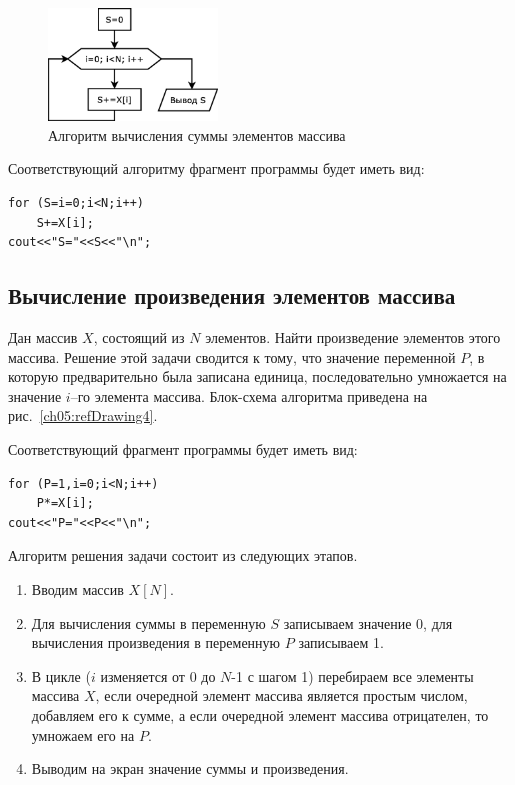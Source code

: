 \begin{figure}[htb]
\begin{center}
\includegraphics[width=0.4\textwidth]{img/ris_5_4}
\caption{Алгоритм вычисления суммы элементов массива}
\label{ch05:refDrawing3}
\end{center}
\end{figure}

Соответствующий алгоритму фрагмент программы будет иметь вид:
\begin{lstlisting}
for (S=i=0;i<N;i++)
    S+=X[i];
cout<<"S="<<S<<"\n";
\end{lstlisting}

\subsection[Вычисление произведения элементов массива]{Вычисление произведения элементов массива}
Дан массив $X$, состоящий из $N$ элементов. Найти произведение элементов этого массива. Решение этой задачи сводится к тому, что значение переменной
$P$, в которую предварительно была записана единица, последовательно умножается на значение
$i$–го элемента массива. Блок-схема алгоритма приведена на рис.~\ref{ch05:refDrawing4}.

Соответствующий фрагмент программы будет иметь вид:
\begin{lstlisting}
for (P=1,i=0;i<N;i++)
    P*=X[i];
cout<<"P="<<P<<"\n";
\end{lstlisting}


Алгоритм решения задачи состоит из следующих этапов.

\begin{enumerate}
\item Вводим массив $X[N]$.
\item Для вычисления суммы в переменную $S$ записываем значение 0, для вычисления произведения в
переменную $P$ записываем 1.
\item В цикле ($i$ изменяется от 0 до $N$-1 с шагом 1) перебираем все элементы
массива $X$, если очередной элемент массива является простым числом, добавляем его к сумме, а если
очередной элемент массива отрицателен, то умножаем его на $P$.
\item Выводим на экран значение суммы и произведения.
\end{enumerate}

